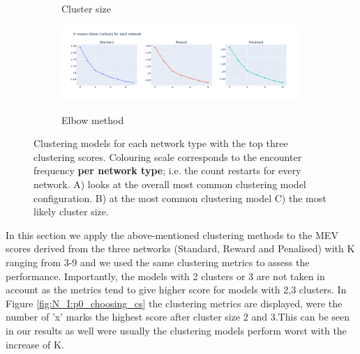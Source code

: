 \begin{figure}[!htb]
\begin{subfigure}[b]{0.49\textwidth}
        \caption{Cluster size}
    \end{subfigure}
     \hfill
    \begin{subfigure}[b]{0.49\textwidth}
        \centering
        \includegraphics[width=\textwidth, keepaspectratio]{Sections/Network_I/Resources/P0/p0_elbowMethod_4K.png}
        \label{fig:N_I:p0_elbow_method}
        \caption{Elbow method}
    \end{subfigure}
    \caption{Clustering models for each network type with the top three clustering scores. Colouring scale corresponds to the encounter frequency \textbf{per network type}; i.e. the count restarts for every network. A) looks at the overall most common clustering model configuration. B) at the most common clustering model C) the most likely cluster size.}
    \label{fig:N_I:p0_top_3_metrics}
\end{figure}


In this section we apply the above-mentioned clustering methods to the MEV scores derived from the three networks (Standard, Reward and Penalised) with K ranging from 3-9 and we used the same clustering metrics to assess the performance. Importantly, the models with 2 clusters or 3 are not taken in account as the metrics tend to give higher score for models with 2,3 clusters. In Figure \ref{fig:N_I:p0_choosing_cs} the clustering metrics are displayed, were the number of 'x' marks the highest score after cluster size 2 and 3.This can be seen in our results as well were usually the clustering models perform worst with the increase of K. 

